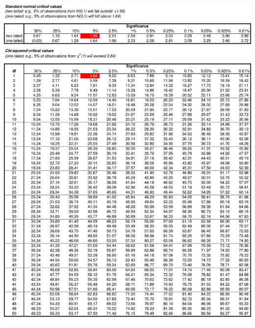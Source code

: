 \documentclass[8pt,letterpaper, landscape]{extarticle} %
\begin{document}
\printindex
\begin{center}
\includegraphics[height=9.75in, angle=90]{cv1}

\end{center}
\end{document}
